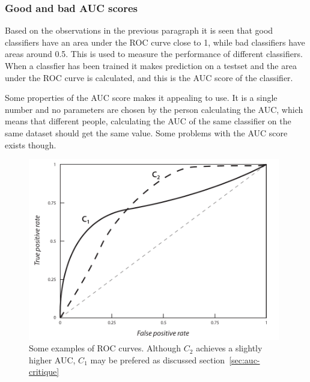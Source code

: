 \subsubsection{Good and bad AUC scores}
Based on the observations in the previous paragraph it is seen that good classifiers have an area under the ROC curve close to 1, while bad classifiers have areas around 0.5. This is used to measure the performance of different classifiers. When a classfier has been trained it makes prediction on a testset and the area under the ROC curve is calculated, and this is the AUC score of the classifier. \par
Some properties of the AUC score makes it appealing to use. It is a single number and no parameters are chosen by the person calculating the AUC, which means that different people, calculating the AUC of the same classifier on the same dataset should get the same value. Some problems with the AUC score exists though.
\begin{figure}[ht]
    \centering
    \includegraphics[width=110mm]{media/roc.pdf}
    \caption{Some examples of ROC curves. Although $C_2$ achieves a slightly higher AUC, $C_1$ may be prefered as discussed section~\ref{sec:auc-critique}}\label{fig:example-rocs}
\end{figure}

